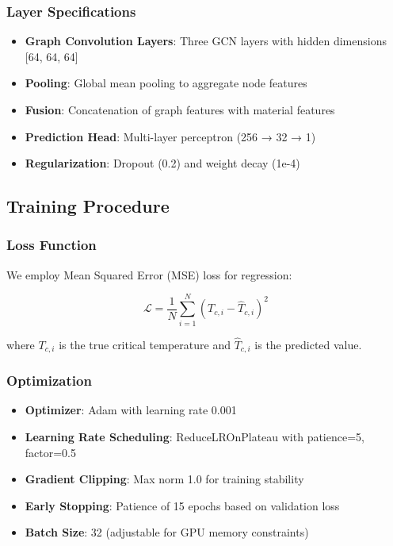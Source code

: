 \documentclass[11pt,a4paper]{article}
\begin{document}
\subsubsection{Layer Specifications}

\begin{itemize}
    \item \textbf{Graph Convolution Layers}: Three GCN layers with hidden dimensions [64, 64, 64]
    \item \textbf{Pooling}: Global mean pooling to aggregate node features
    \item \textbf{Fusion}: Concatenation of graph features with material features
    \item \textbf{Prediction Head}: Multi-layer perceptron (256 → 32 → 1)
    \item \textbf{Regularization}: Dropout (0.2) and weight decay (1e-4)
\end{itemize}

\subsection{Training Procedure}

\subsubsection{Loss Function}

We employ Mean Squared Error (MSE) loss for regression:

\begin{equation}
\mathcal{L} = \frac{1}{N}\sum_{i=1}^{N}(T_{c,i} - \hat{T}_{c,i})^2
\end{equation}

where $T_{c,i}$ is the true critical temperature and $\hat{T}_{c,i}$ is the predicted value.

\subsubsection{Optimization}

\begin{itemize}
    \item \textbf{Optimizer}: Adam with learning rate 0.001
    \item \textbf{Learning Rate Scheduling}: ReduceLROnPlateau with patience=5, factor=0.5
    \item \textbf{Gradient Clipping}: Max norm 1.0 for training stability
    \item \textbf{Early Stopping}: Patience of 15 epochs based on validation loss
    \item \textbf{Batch Size}: 32 (adjustable for GPU memory constraints)
\end{itemize}
\end{document}
